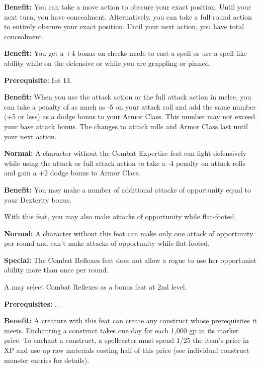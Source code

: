 \textbf{Benefit:} You can take a move action to obscure your exact position. Until 
your next turn, you have concealment. Alternatively, you can take a full-round 
action to entirely obscure your exact position. Until your next action, you have 
total concealment.


\textbf{Benefit:} You get a +4 bonus on  checks made to cast a spell 
or use a spell-like ability while on the defensive or while you are grappling or 
pinned.


\textbf{Prerequisite:} Int 13.

\textbf{Benefit:} When you use the attack action or the full attack action in melee, 
you can take a penalty of as much as -5 on your attack roll and add the same number 
(+5 or less) as a dodge bonus to your Armor Class. This number may not exceed your 
base attack bonus. The changes to attack rolls and Armor Class last until your 
next action.

\textbf{Normal:} A character without the Combat Expertise feat can fight defensively 
while using the attack or full attack action to take a -4 penalty on attack rolls 
and gain a +2 dodge bonus to Armor Class.


\textbf{Benefit:} You may make a number of additional attacks of opportunity equal 
to your Dexterity bonus.

With this feat, you may also make attacks of opportunity while flat-footed.

\textbf{Normal:} A character without this feat can make only one attack of opportunity 
per round and can't make attacks of opportunity while flat-footed.

\textbf{Special:} The Combat Reflexes feat does not allow a rogue to use her opportunist 
ability more than once per round.

A  may select Combat Reflexes as a bonus feat at 2nd level.


\textbf{Prerequisites:} , .

\textbf{Benefit:} A creature with this feat can create any construct whose prerequisites 
it meets. Enchanting a construct takes one day for each 1,000 gp in its market 
price. To enchant a construct, a spellcaster must spend 1/25 the item's price in 
XP and use up raw materials costing half of this price (see individual construct 
monster entries for details).

